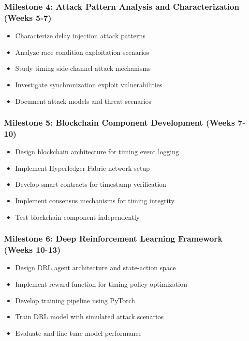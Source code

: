 \subsubsection*{Milestone 4: Attack Pattern Analysis and Characterization (Weeks 5-7)}
\begin{itemize}
    \item Characterize delay injection attack patterns
    \item Analyze race condition exploitation scenarios
    \item Study timing side-channel attack mechanisms
    \item Investigate synchronization exploit vulnerabilities
    \item Document attack models and threat scenarios
\end{itemize}

\subsubsection*{Milestone 5: Blockchain Component Development (Weeks 7-10)}
\begin{itemize}
    \item Design blockchain architecture for timing event logging
    \item Implement Hyperledger Fabric network setup
    \item Develop smart contracts for timestamp verification
    \item Implement consensus mechanisms for timing integrity
    \item Test blockchain component independently
\end{itemize}

\subsubsection*{Milestone 6: Deep Reinforcement Learning Framework (Weeks 10-13)}
\begin{itemize}
    \item Design DRL agent architecture and state-action space
    \item Implement reward function for timing policy optimization
    \item Develop training pipeline using PyTorch
    \item Train DRL model with simulated attack scenarios
    \item Evaluate and fine-tune model performance
\end{itemize}

